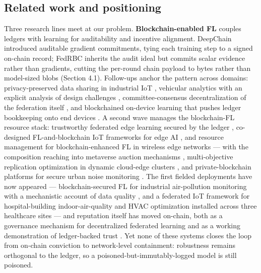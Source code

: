 \documentclass[cmc,article,submit,moreauthors,pdftex]{Definitions/tsp}
\begin{document}
\subsection{Related work and positioning}\label{sec:related-work-and-positioning}

Three research lines meet at our problem. \textbf{Blockchain-enabled FL} couples ledgers with learning for auditability and incentive alignment. DeepChain \cite{ref-22} introduced auditable gradient commitments, tying each training step to a signed on-chain record; FedRBC inherits the audit ideal but commits scalar evidence rather than gradients, cutting the per-round chain payload to bytes rather than model-sized blobs (Section 4.1). Follow-ups anchor the pattern across domains: privacy-preserved data sharing in industrial IoT \cite{ref-23}, vehicular analytics with an explicit analysis of design challenges \cite{ref-24}, committee-consensus decentralization of the federation itself \cite{ref-25}, and blockchained on-device learning that pushes ledger bookkeeping onto end devices \cite{ref-26}. A second wave manages the blockchain-FL resource stack: trustworthy federated edge learning secured by the ledger \cite{ref-27}, co-designed FL-and-blockchain IoT frameworks for edge AI \cite{ref-28}, and resource management for blockchain-enhanced FL in wireless edge networks \cite{ref-29} --- with the composition reaching into metaverse auction mechanisms \cite{ref-30}, multi-objective replication optimization in dynamic cloud-edge clusters \cite{ref-31}, and private-blockchain platforms for secure urban noise monitoring \cite{ref-32}. The first fielded deployments have now appeared --- blockchain-secured FL for industrial air-pollution monitoring with a mechanistic account of data quality \cite{ref-33}, and a federated IoT framework for hospital-building indoor-air-quality and HVAC optimization installed across three healthcare sites \cite{ref-34} --- and reputation itself has moved on-chain, both as a governance mechanism for decentralized federated learning \cite{ref-35} and as a working demonstration of ledger-backed trust \cite{ref-36}. Yet none of these systems closes the loop from on-chain conviction to network-level containment: robustness remains orthogonal to the ledger, so a poisoned-but-immutably-logged model is still poisoned.
\end{document}
